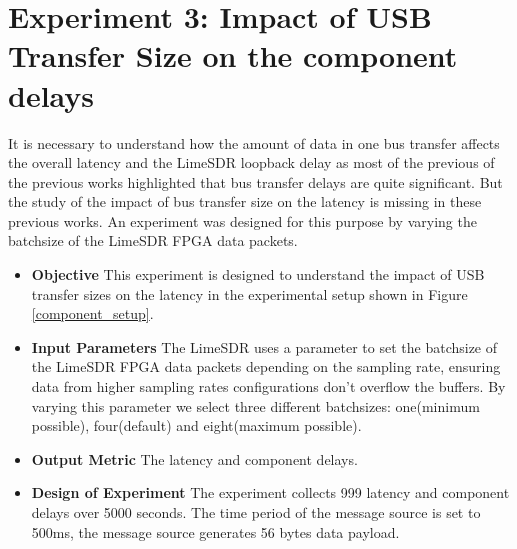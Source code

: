 \section{Experiment 3: Impact of USB Transfer Size on the component delays} \label{exp3}

It is necessary to understand how the amount of data in one bus transfer affects the overall latency and the LimeSDR loopback delay as most of the previous of the previous works highlighted that bus transfer delays are quite significant.
But the study of the impact of bus transfer size on the latency is missing in these previous works.
An experiment was designed for this purpose by varying the batchsize of the LimeSDR FPGA data packets.

\begin{itemize}
    \item \textbf{Objective} This experiment is designed to understand the impact of USB transfer sizes on the latency in the experimental setup shown in Figure \ref{component_setup}.
    \item \textbf{Input Parameters} The LimeSDR uses a parameter to set the batchsize of the LimeSDR FPGA data packets depending on the sampling rate, ensuring data from higher sampling rates configurations don't overflow the buffers.
    By varying this parameter we select three different batchsizes:
    one(minimum possible), four(default) and eight(maximum possible).
    \item \textbf{Output Metric} The latency and component delays.
    \item \textbf{Design of Experiment} The experiment collects 999 latency and component delays over 5000 seconds. The time period of the message source is set to 500ms, the message source generates 56 bytes data payload.
\end{itemize}






